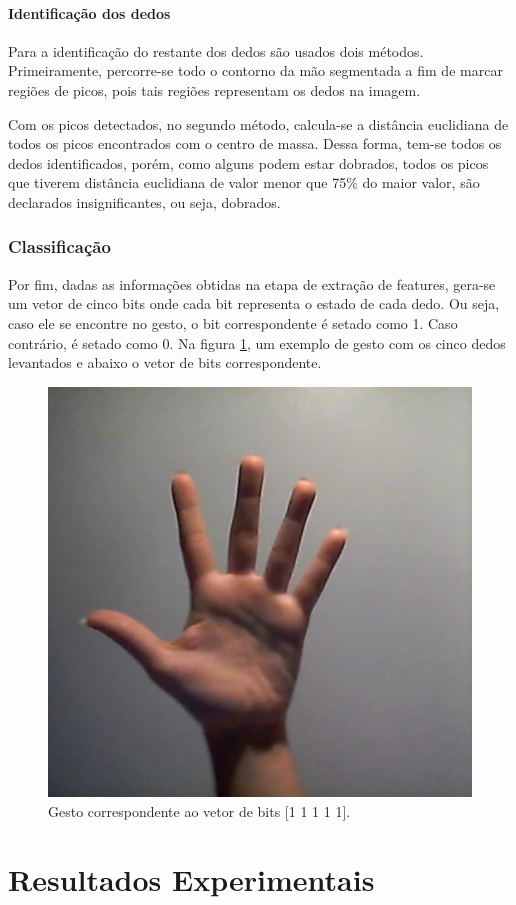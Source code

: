 \documentclass[conference]{IEEEtran}
\begin{document}
\paragraph{Identificação dos dedos}
\par Para a identificação do restante dos dedos são usados dois métodos. Primeiramente, percorre-se todo o contorno da mão segmentada a fim de marcar regiões de picos, pois tais regiões representam os dedos na imagem.
\par Com os picos detectados, no segundo método, calcula-se a distância euclidiana de todos os picos encontrados com o centro de massa. Dessa forma, tem-se todos os dedos identificados, porém, como alguns podem estar dobrados, todos os picos que tiverem distância euclidiana de valor menor que 75\% do maior valor, são declarados insignificantes, ou seja, dobrados.

\subsubsection{Classificação}
\par Por fim, dadas as informações obtidas na etapa de extração de features, gera-se um vetor de cinco bits onde cada bit representa o estado de cada dedo. Ou seja, caso ele se encontre no gesto, o bit correspondente é setado como 1. Caso contrário, é setado como 0. Na figura \ref{bits}, um exemplo de gesto com os cinco dedos levantados e abaixo o vetor de bits correspondente.

\begin{figure}
\centering
  \centering
  \includegraphics[width=.4\linewidth]{figs/bits.jpg}
  \caption{Gesto correspondente ao vetor de bits [1 1 1 1 1].}
\label{bits}
\end{figure}

\section{Resultados Experimentais}
\end{document}
